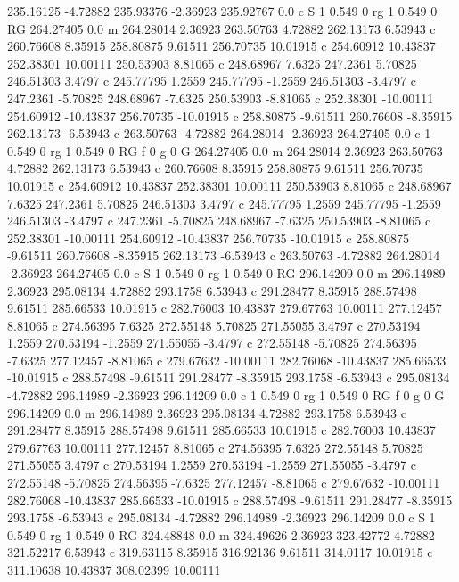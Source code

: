 235.16125 -4.72882 
235.93376 -2.36923 
235.92767 0.0 c 
S 
1 0.549 0 rg 1 0.549 0 RG 
264.27405 0.0 m 
264.28014 2.36923 
263.50763 4.72882 
262.13173 6.53943 c 
260.76608 8.35915 
258.80875 9.61511 
256.70735 10.01915 c 
254.60912 10.43837 
252.38301 10.00111 
250.53903 8.81065 c 
248.68967 7.6325 
247.2361 5.70825 
246.51303 3.4797 c 
245.77795 1.2559 
245.77795 -1.2559 
246.51303 -3.4797 c 
247.2361 -5.70825 
248.68967 -7.6325 
250.53903 -8.81065 c 
252.38301 -10.00111 
254.60912 -10.43837 
256.70735 -10.01915 c 
258.80875 -9.61511 
260.76608 -8.35915 
262.13173 -6.53943 c 
263.50763 -4.72882 
264.28014 -2.36923 
264.27405 0.0 c 
1 0.549 0 rg 1 0.549 0 RG f 
0 g 0 G 
264.27405 0.0 m 
264.28014 2.36923 
263.50763 4.72882 
262.13173 6.53943 c 
260.76608 8.35915 
258.80875 9.61511 
256.70735 10.01915 c 
254.60912 10.43837 
252.38301 10.00111 
250.53903 8.81065 c 
248.68967 7.6325 
247.2361 5.70825 
246.51303 3.4797 c 
245.77795 1.2559 
245.77795 -1.2559 
246.51303 -3.4797 c 
247.2361 -5.70825 
248.68967 -7.6325 
250.53903 -8.81065 c 
252.38301 -10.00111 
254.60912 -10.43837 
256.70735 -10.01915 c 
258.80875 -9.61511 
260.76608 -8.35915 
262.13173 -6.53943 c 
263.50763 -4.72882 
264.28014 -2.36923 
264.27405 0.0 c 
S 
1 0.549 0 rg 1 0.549 0 RG 
296.14209 0.0 m 
296.14989 2.36923 
295.08134 4.72882 
293.1758 6.53943 c 
291.28477 8.35915 
288.57498 9.61511 
285.66533 10.01915 c 
282.76003 10.43837 
279.67763 10.00111 
277.12457 8.81065 c 
274.56395 7.6325 
272.55148 5.70825 
271.55055 3.4797 c 
270.53194 1.2559 
270.53194 -1.2559 
271.55055 -3.4797 c 
272.55148 -5.70825 
274.56395 -7.6325 
277.12457 -8.81065 c 
279.67632 -10.00111 
282.76068 -10.43837 
285.66533 -10.01915 c 
288.57498 -9.61511 
291.28477 -8.35915 
293.1758 -6.53943 c 
295.08134 -4.72882 
296.14989 -2.36923 
296.14209 0.0 c 
1 0.549 0 rg 1 0.549 0 RG f 
0 g 0 G 
296.14209 0.0 m 
296.14989 2.36923 
295.08134 4.72882 
293.1758 6.53943 c 
291.28477 8.35915 
288.57498 9.61511 
285.66533 10.01915 c 
282.76003 10.43837 
279.67763 10.00111 
277.12457 8.81065 c 
274.56395 7.6325 
272.55148 5.70825 
271.55055 3.4797 c 
270.53194 1.2559 
270.53194 -1.2559 
271.55055 -3.4797 c 
272.55148 -5.70825 
274.56395 -7.6325 
277.12457 -8.81065 c 
279.67632 -10.00111 
282.76068 -10.43837 
285.66533 -10.01915 c 
288.57498 -9.61511 
291.28477 -8.35915 
293.1758 -6.53943 c 
295.08134 -4.72882 
296.14989 -2.36923 
296.14209 0.0 c 
S 
1 0.549 0 rg 1 0.549 0 RG 
324.48848 0.0 m 
324.49626 2.36923 
323.42772 4.72882 
321.52217 6.53943 c 
319.63115 8.35915 
316.92136 9.61511 
314.0117 10.01915 c 
311.10638 10.43837 
308.02399 10.00111 
